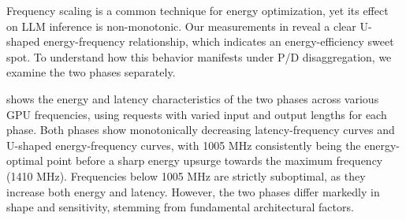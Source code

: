 Frequency scaling is a common technique for energy optimization, yet its effect on LLM inference is non-monotonic.
Our measurements in  reveal a clear U-shaped energy-frequency relationship, which indicates an energy-efficiency sweet spot.
To understand how this behavior manifests under P/D disaggregation, we  examine the two phases separately.

 shows the energy and latency characteristics of the two phases across various GPU frequencies, using requests with varied input and output lengths for each phase.
Both phases show monotonically decreasing latency-frequency curves and U-shaped energy-frequency curves, with 1005 MHz consistently being the energy-optimal point before a sharp energy upsurge towards the maximum frequency (1410 MHz).
Frequencies below 1005 MHz are strictly suboptimal, as they increase both energy and latency.
However, the two phases differ markedly in shape and sensitivity, stemming from fundamental architectural factors.

